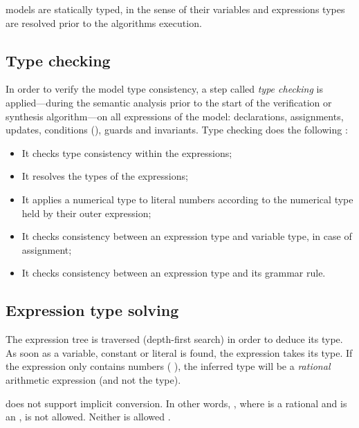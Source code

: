 \imitator{} models are statically typed, in the sense of their variables and expressions types are resolved prior to the algorithms execution.


\subsection{Type checking}

In order to verify the model type consistency, a step called \emph{type checking} is applied---during the semantic analysis prior to the start of the verification or synthesis algorithm---on all expressions of the model: declarations, assignments, updates, conditions (), guards and invariants.
Type checking does the following :

\begin{itemize}
	\item It checks type consistency within the expressions;
	\item It resolves the types of the expressions;
	\item It applies a numerical type to literal numbers according to the numerical type held by their outer expression;
	\item It checks consistency between an expression type and variable type, in case of assignment;
	\item It checks consistency between an expression type and its grammar rule.
\end{itemize}

\subsection{Expression type solving}

The expression tree is traversed (depth-first search) in order to deduce its type.
As soon as a variable, constant or literal is found, the expression takes its type.
If the expression only contains numbers (\eg{} ), the inferred type will be a \emph{rational} arithmetic expression (and not the  type).

\imitator{} does not support implicit conversion.
In other words, , where  is a rational and  is an , is not allowed.
Neither is allowed .

